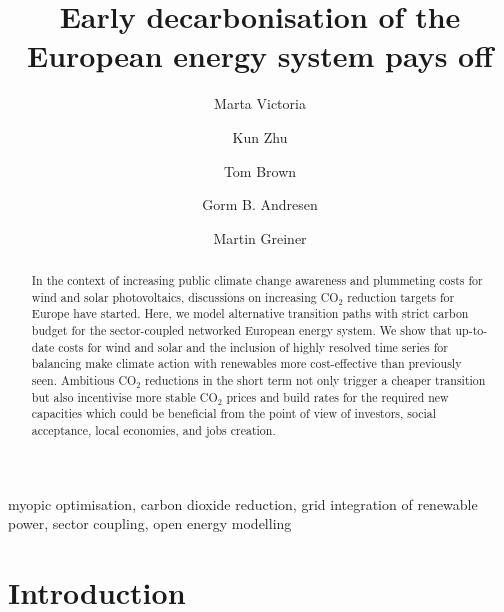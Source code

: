 \documentclass[5p]{elsarticle} %
\begin{document}
\begin{frontmatter}

\title{Early decarbonisation of the European energy system pays off}
\author[mymainaddress,iClimate]{Marta Victoria}
\author[mymainaddress]{Kun Zhu}
\author[kitaddress]{Tom Brown}
\author[mymainaddress,iClimate]{Gorm B. Andresen}
\author[mymainaddress,iClimate]{Martin Greiner}
\address[mymainaddress]{Department of Engineering, Aarhus University, Inge Lehmanns Gade 10, 8000 Aarhus, Denmark}
\address[iClimate]{iCLIMATE Interdisciplinary Centre for Climate Change, Aarhus University}
\address[kitaddress]{Institute for Automation and Applied Informatics (IAI), Karlsruhe Institute of Technology (KIT), Forschungszentrum 449, 76344, Eggenstein-Leopoldshafen, Germany}


\begin{abstract}

In the context of increasing public climate change awareness and plummeting costs for wind and solar photovoltaics, discussions on increasing CO$_2$ reduction targets for Europe have started. Here, we model alternative transition paths with strict carbon budget for the sector-coupled networked European energy system. We show that up-to-date costs for wind and solar and the inclusion of highly resolved time series for balancing make climate action with renewables more cost-effective than previously seen. Ambitious CO$_2$ reductions in the short term not only trigger a cheaper transition but also incentivise more stable CO$_2$ prices and build rates for the required new capacities which could be beneficial from the point of view of investors, social acceptance, local economies, and jobs creation.

\end{abstract}

\begin{keyword}
myopic optimisation, carbon dioxide reduction, grid integration of renewable power, sector coupling, open energy modelling
\end{keyword}

\end{frontmatter}

\linenumbers

\section{Introduction}
\end{document}
